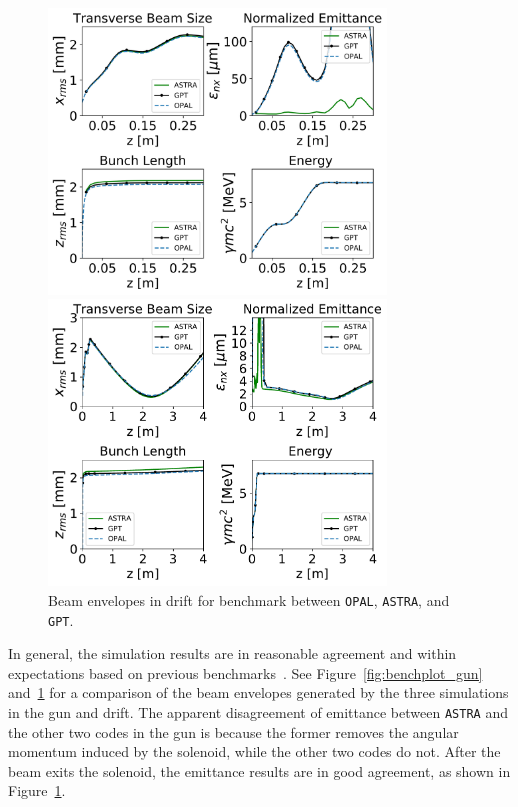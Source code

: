 \begin{figure}
	\begin{center}
		\includegraphics[width=0.8\textwidth]{images/benchmark_gun}
		\cprotect\caption{Beam envelopes in the gun for benchmark between \verb|OPAL|, \verb|ASTRA|, and \verb|GPT|.}
	    \label{fig:benchplot_gun}

        \vspace*{\floatsep}
        
		\includegraphics[width=0.8\textwidth]{images/benchmark_5m}
		\cprotect\caption{Beam envelopes in drift for benchmark between \verb|OPAL|, \verb|ASTRA|, and \verb|GPT|.}
	    \label{fig:benchplot_5m}
	\end{center}
\end{figure}

In general, the simulation results are in reasonable agreement 
and within expectations based on previous benchmarks~\cite{codecompare}. 
See Figure~\ref{fig:benchplot_gun} and~\ref{fig:benchplot_5m} 
for a comparison of the beam envelopes generated by the three simulations in the gun and drift. 
The apparent disagreement of emittance between \verb|ASTRA| and the other
two codes in the gun is because the former removes the angular momentum   
induced by the solenoid, while the other two codes do not. 
After the beam exits the solenoid, the emittance results  
are in good agreement, as shown in Figure~\ref{fig:benchplot_5m}.

